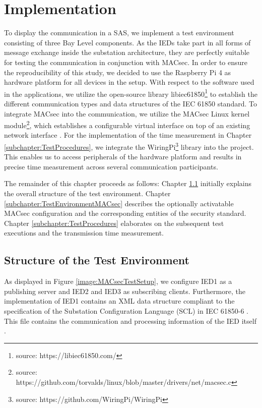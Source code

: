\documentclass[conference, onecolumn, a4paper]{IEEEtran}
\begin{document}
\section{Implementation}
\label{chapter:implementation}
\noindent To display the communication in a SAS, we implement a test environment consisting of three Bay Level components. As the IEDs take part 
in all forms of message exchange inside the substation architecture, they are perfectly suitable for testing the communication in conjunction with MACsec. 
In order to ensure the reproducibility of this study, we decided to use the Raspberry Pi 4 as hardware platform for all devices in the setup. With respect 
to the software used in the applications, we utilize the open-source library libiec61850\footnote{source: https://libiec61850.com/} to establish the 
different communication types and data structures of the IEC 61850 standard. To integrate MACsec into the communication, we utilize the MACsec Linux kernel 
module\footnote{source: https://github.com/torvalds/linux/blob/master/drivers/net/macsec.c}, which establishes a configurable virtual interface on top of 
an existing network interface \cite{MACsecLinuxModuleDoc:2016}. For the implementation of the time measurement in Chapter \ref{subchapter:TestProcedures},  
we integrate the WiringPi\footnote{source: https://github.com/WiringPi/WiringPi} library into the project. This enables us to access peripherals of the 
hardware platform and results in precise time measurement across several communication participants. 

\smallskip 
The remainder of this chapter proceeds as follows: Chapter \ref{subchapter:TestEnvironmentStructure} initially explains the overall structure of the 
test environment. Chapter \ref{subchapter:TestEnvironmentMACsec} describes the optionally activatable MACsec configuration and the corresponding 
entities of the security standard. Chapter \ref{subchapter:TestProcedures} elaborates on the subsequent test executions and the transmission time 
measurement. 

\subsection{Structure of the Test Environment}
\label{subchapter:TestEnvironmentStructure}
\noindent As displayed in Figure \ref{image:MACsecTestSetup}, we configure IED1 as a publishing server and IED2 and IED3 as subscribing clients. 
Furthermore, the implementation of IED1 contains an XML data structure compliant to the specification of the Substation Configuration Language (SCL) 
in IEC 61850-6 \cite{IEC61850-6:2010}. This file contains the communication and processing information of the IED itself \cite{IEC61850_Overview:2006}.
\end{document}
